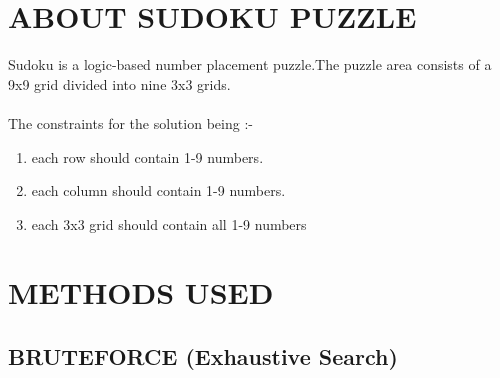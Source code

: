 \documentclass[11pt]{article}
\begin{document}
\pagebreak

{ \doublespacing
{}
\tableofcontents %
}
\maketitle
\setcounter{secnumdepth}{6}
\section{ABOUT SUDOKU PUZZLE}
Sudoku is a logic-based number placement puzzle.The puzzle area consists of a 9x9 grid divided into nine 3x3 grids.\\\\The constraints for the solution being :-
\begin{enumerate}[label=(\roman*)]
\item each row should contain 1-9 numbers.
\item each column should contain 1-9 numbers.
\item each 3x3 grid should contain all 1-9 numbers
\end{enumerate}

\section{METHODS USED}
\subsection{BRUTEFORCE (Exhaustive Search)}
\end{document}
